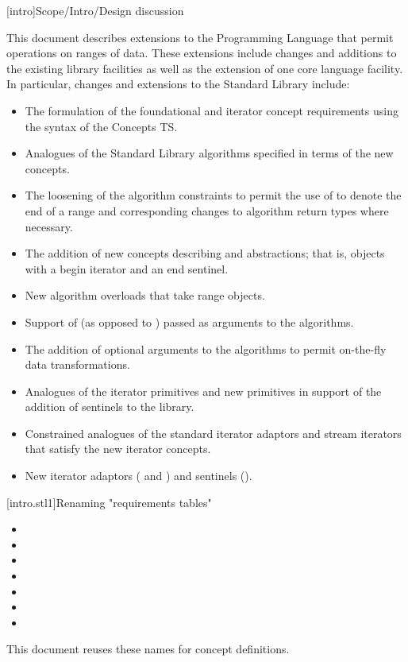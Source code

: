 [intro]{Scope/Intro/Design discussion}


\pnum
This document describes extensions to the \Cpp
Programming Language that
permit operations on ranges of data. These extensions include
changes and additions to the existing library facilities as well
as the extension of one core language facility. In particular,
changes and extensions to the Standard Library include:

\begin{itemize}
\item The formulation of the foundational and iterator concept requirements
using the syntax of the Concepts TS.
\item Analogues of the Standard Library algorithms specified in terms of the new
concepts.
\item The loosening of the algorithm constraints to permit the use of
 to denote the end of a range and corresponding changes to algorithm
return types where necessary.
\item The addition of new concepts describing  and 
abstractions; that is, objects with a begin iterator and an end sentinel.
\item New algorithm overloads that take range objects.
\item Support of  (as opposed to )
passed as arguments to the algorithms.
\item The addition of optional  arguments to the algorithms to
permit on-the-fly data transformations.
\item Analogues of the iterator primitives and new primitives in support of the
addition of sentinels to the library.
\item Constrained analogues of the standard iterator adaptors and stream iterators
that satisfy the new iterator concepts.
\item New iterator adaptors ( and ) and
sentinels ().
\end{itemize}

[intro.stl1]{Renaming "requirements tables"}

\pnum
{}
\begin{itemize}
\item {}
\item {}
\item {}
\item {}
\item {}
\item {}
\item {}
\end{itemize}
This document reuses these names for concept definitions.

